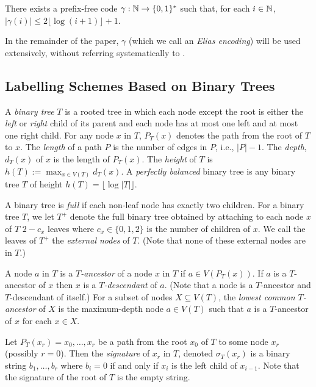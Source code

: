 \documentclass[kpfonts]{patmorin}
\newcommand{\Oh}{\mathcal{O}}
\let\le\leqslant
\begin{document}
\begin{lem}
  There exists a prefix-free code $\gamma:\mathbb{N}\to\{0,1\}^*$ such that, for each $i\in\mathbb{N}$, $|\gamma(i)|\le 2\lfloor\log(i+1)\rfloor + 1$.%
  \end{lem}

  In the remainder of the paper, $\gamma$ (which we call an \emph{Elias encoding}) will be used extensively, without referring systematically to .

\subsection{Labelling Schemes Based on Binary Trees}

A \emph{binary tree} $T$ is a rooted tree in which each node except the root is either the \emph{left} or \emph{right} child of its parent and each node has at most one left and at most one right child.  For any node $x$ in $T$, $P_T(x)$ denotes the path from the root of $T$ to $x$.  The \emph{length} of a path $P$ is the number of edges in $P$, i.e., $|P|-1$.  The \emph{depth}, $d_T(x)$ of $x$ is the length of $P_T(x)$.  The \emph{height} of $T$ is $h(T):=\max_{x\in V(T)} d_T(x)$.  A \emph{perfectly balanced} binary tree is any binary tree $T$ of height $h(T)=\lfloor\log|T|\rfloor$.

A binary tree is \emph{full} if each non-leaf node has exactly two children. For a binary tree $T$, we let $T^+$ denote the full binary tree obtained by attaching to each node $x$ of $T$ $2-c_x$ leaves where $c_x \in\{0,1,2\}$ is the number of children of $x$.  We call the leaves of $T^+$ the \emph{external nodes} of $T$.  (Note that none of these external nodes are in $T$.)

A node $a$ in $T$ is a \emph{$T$-ancestor} of a node $x$ in $T$ if $a\in V(P_T(x))$. If $a$ is a $T$-ancestor of $x$ then $x$ is a \emph{$T$-descendant} of $a$. (Note that a node is a $T$-ancestor and $T$-descendant of itself.)  For a subset of nodes $X\subseteq V(T)$, the \emph{lowest common $T$-ancestor} of $X$ is the maximum-depth node $a\in V(T)$ such that $a$ is a $T$-ancestor of $x$ for each $x\in X$.

Let $P_T(x_r)=x_0,\dots,x_{r}$ be a path from the root $x_0$ of $T$ to some node $x_r$ (possibly $r=0$).  Then the \emph{signature} of $x_r$ in $T$, denoted $\sigma_T(x_r)$ is a binary string $b_1,\dots,b_r$ where $b_i=0$ if and only if $x_{i}$ is the left child of $x_{i-1}$.
Note that the signature of the root of $T$ is the empty string.
\end{document}
